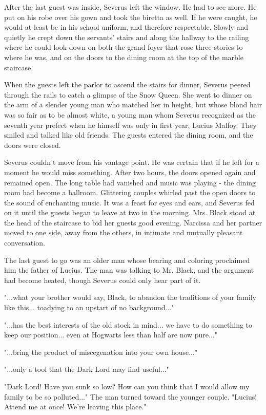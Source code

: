 \documentclass[a4paper,11pt]{article}
\begin{document}
After the last guest was inside, Severus left the window. He had to see more. He put on his robe over his gown and took the biretta as well. If he were caught, he would at least be in his school uniform, and therefore respectable. Slowly and quietly he crept down the servants' stairs and along the hallway to the railing where he could look down on both the grand foyer that rose three stories to where he was, and on the doors to the dining room at the top of the marble staircase.

When the guests left the parlor to ascend the stairs for dinner, Severus peered through the rails to catch a glimpse of the Snow Queen. She went to dinner on the arm of a slender young man who matched her in height, but whose blond hair was so fair as to be almost white, a young man whom Severus recognized as the seventh year prefect when he himself was only in first year, Lucius Malfoy. They smiled and talked like old friends. The guests entered the dining room, and the doors were closed.

Severus couldn't move from his vantage point. He was certain that if he left for a moment he would miss something. After two hours, the doors opened again and remained open. The long table had vanished and music was playing - the dining room had become a ballroom. Glittering couples whirled past the open doors to the sound of enchanting music. It was a feast for eyes and ears, and Severus fed on it until the guests began to leave at two in the morning. Mrs. Black stood at the head of the staircase to bid her guests good evening. Narcissa and her partner moved to one side, away from the others, in intimate and mutually pleasant conversation.

The last guest to go was an older man whose bearing and coloring proclaimed him the father of Lucius. The man was talking to Mr. Black, and the argument had become heated, though Severus could only hear part of it.

"...what your brother would say, Black, to abandon the traditions of your family like this... toadying to an upstart of no background..."

"...has the best interests of the old stock in mind... we have to do something to keep our position... even at Hogwarts less than half are now pure..."

"...bring the product of miscegenation into your own house..."

"...only a tool that the Dark Lord may find useful..."

"Dark Lord! Have you sunk so low? How can you think that I would allow my family to be so polluted..." The man turned toward the younger couple. "Lucius! Attend me at once! We're leaving this place."
\end{document}
